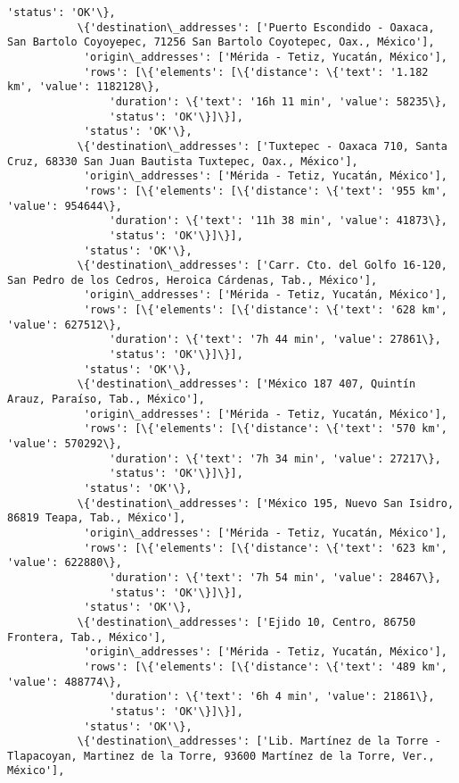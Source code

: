 \documentclass[11pt]{article}
\begin{document}
\begin{Verbatim}[commandchars=\\\{\}]
            'status': 'OK'\},
           \{'destination\_addresses': ['Puerto Escondido - Oaxaca, San Bartolo Coyoyepec, 71256 San Bartolo Coyotepec, Oax., México'],
            'origin\_addresses': ['Mérida - Tetiz, Yucatán, México'],
            'rows': [\{'elements': [\{'distance': \{'text': '1.182 km', 'value': 1182128\},
                'duration': \{'text': '16h 11 min', 'value': 58235\},
                'status': 'OK'\}]\}],
            'status': 'OK'\},
           \{'destination\_addresses': ['Tuxtepec - Oaxaca 710, Santa Cruz, 68330 San Juan Bautista Tuxtepec, Oax., México'],
            'origin\_addresses': ['Mérida - Tetiz, Yucatán, México'],
            'rows': [\{'elements': [\{'distance': \{'text': '955 km', 'value': 954644\},
                'duration': \{'text': '11h 38 min', 'value': 41873\},
                'status': 'OK'\}]\}],
            'status': 'OK'\},
           \{'destination\_addresses': ['Carr. Cto. del Golfo 16-120, San Pedro de los Cedros, Heroica Cárdenas, Tab., México'],
            'origin\_addresses': ['Mérida - Tetiz, Yucatán, México'],
            'rows': [\{'elements': [\{'distance': \{'text': '628 km', 'value': 627512\},
                'duration': \{'text': '7h 44 min', 'value': 27861\},
                'status': 'OK'\}]\}],
            'status': 'OK'\},
           \{'destination\_addresses': ['México 187 407, Quintín Arauz, Paraíso, Tab., México'],
            'origin\_addresses': ['Mérida - Tetiz, Yucatán, México'],
            'rows': [\{'elements': [\{'distance': \{'text': '570 km', 'value': 570292\},
                'duration': \{'text': '7h 34 min', 'value': 27217\},
                'status': 'OK'\}]\}],
            'status': 'OK'\},
           \{'destination\_addresses': ['México 195, Nuevo San Isidro, 86819 Teapa, Tab., México'],
            'origin\_addresses': ['Mérida - Tetiz, Yucatán, México'],
            'rows': [\{'elements': [\{'distance': \{'text': '623 km', 'value': 622880\},
                'duration': \{'text': '7h 54 min', 'value': 28467\},
                'status': 'OK'\}]\}],
            'status': 'OK'\},
           \{'destination\_addresses': ['Ejido 10, Centro, 86750 Frontera, Tab., México'],
            'origin\_addresses': ['Mérida - Tetiz, Yucatán, México'],
            'rows': [\{'elements': [\{'distance': \{'text': '489 km', 'value': 488774\},
                'duration': \{'text': '6h 4 min', 'value': 21861\},
                'status': 'OK'\}]\}],
            'status': 'OK'\},
           \{'destination\_addresses': ['Lib. Martínez de la Torre - Tlapacoyan, Martinez de la Torre, 93600 Martínez de la Torre, Ver., México'],

\end{Verbatim}
\end{document}
